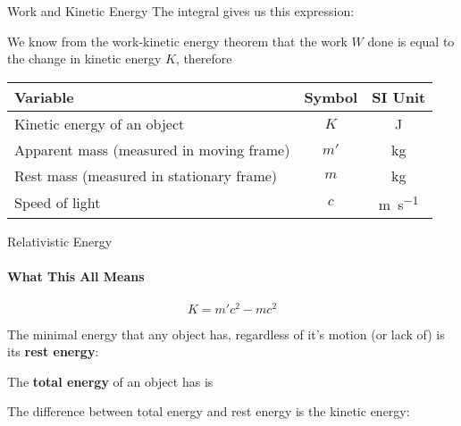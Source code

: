 \documentclass[12pt,compress,aspectratio=169]{beamer}
\newcommand{\eq}[2]{\vspace{#1}{\Large\begin{displaymath}#2\end{displaymath}}}
\begin{document}
\begin{frame}{Work and Kinetic Energy}
  The integral gives us this expression:
  
  \eq{-.25in}{
    W=\gamma mc^2-mc^2
  }

  \vspace{-.15in}We know from the work-kinetic energy theorem that the work $W$
  done is equal to the change in kinetic energy $K$, therefore
  
  \eq{-.2in}{ \boxed{K=m'c^2-mc^2} }

  \vspace{-.1in}
  \begin{center}
    \begin{tabular}{l|c|c}
      \rowcolor{pink}
      \textbf{Variable} & \textbf{Symbol} & \textbf{SI Unit}\\ \hline
      Kinetic energy of an object & $K$  & \si{\joule}\\
      Apparent mass (measured in moving frame) & $m'$ & \si{\kilo\gram}\\
      Rest mass (measured in stationary frame) & $m$  & \si{\kilo\gram}\\
      Speed of light              & $c$ & \si{\metre\per\second}
    \end{tabular}
  \end{center}
\end{frame}



\begin{frame}{Relativistic Energy}
  \framesubtitle{What This All Means}
  {\Large
    \begin{displaymath}
      \boxed{K=m'c^2-mc^2}
    \end{displaymath}
  }

  The minimal energy that any object has, regardless of it's motion (or lack
  of) is its \textbf{rest energy}:
  
  \eq{-.4in}{ E_0=mc^2 }

  \vspace{-.2in}The \textbf{total energy} of an object has is
    
  \eq{-.3in}{
    E_T=m'c^2=\gamma mc^2
  }

  \vspace{-.2in}The difference between total energy and rest energy is the
  kinetic energy:

  \eq{-.3in}{
    K=E_T-E_0
  }
\end{frame}
\end{document}
